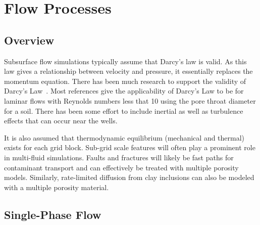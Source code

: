 %
%

\def\bnabla{{\boldsymbol{\nabla}}}
\def\bg{{\boldsymbol{g}}}
\def\bq{{\boldsymbol{q}}}
\def\K{{\mathbb K}}

\def\bx{{\boldsymbol{x}}}

\def\ucdot{{\,\cdot\,}}
\def\ukg{{\rm kg}}
\def\um{{\rm m}}
\def\us{{\rm s}}
\def\umol{{\rm mol}}
\def\upa{{\rm Pa}}

\section{Flow Processes}         
\label{sec:flow}

\subsection{Overview}

Subsurface flow simulations typically assume that Darcy's law is
valid. As this law gives a relationship between velocity and pressure,
it essentially replaces the momentum equation. There has been much
research to support the validity of Darcy's
Law~\citep{bear-1972}.
Most references give the applicability of
Darcy's Law to be for laminar flows with Reynolds numbers less that 10 using the pore throat diameter for a soil.
There has been some effort to include inertial as well as turbulence effects that can occur near the wells.

It is also assumed that thermodynamic equilibrium (mechanical and
thermal) exists for each grid block.  Sub-grid scale features will
often play a prominent role in multi-fluid simulations. Faults and
fractures will likely be fast paths for contaminant transport and can
effectively be treated with multiple porosity models. Similarly,
rate-limited diffusion from clay inclusions can also be modeled with a
multiple porosity material.



\subsection{Single-Phase Flow}
\label{sec:single-phase-flow}

